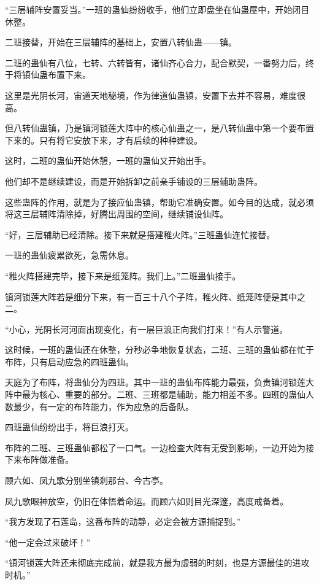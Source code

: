 
\begin{this_body}

“三层辅阵安置妥当。”一班的蛊仙纷纷收手，他们立即盘坐在仙蛊屋中，开始闭目休整。

二班接替，开始在三层辅阵的基础上，安置八转仙蛊——镇。

二班的蛊仙有八位，七转、六转皆有，诸仙齐心合力，配合默契，一番努力后，终于将镇仙蛊布置下来。

这里是光阴长河，宙道天地秘境，作为律道仙蛊镇，安置下去并不容易，难度很高。

但八转仙蛊镇，乃是镇河锁莲大阵中的核心仙蛊之一，是八转仙蛊中第一个要布置下来的。只有将它安放下来，才有后续的种种建设。

这时，二班的蛊仙开始休憩，一班的蛊仙又开始出手。

他们却不是继续建设，而是开始拆卸之前亲手铺设的三层辅助蛊阵。

这些蛊阵的作用，就是为了接应仙蛊镇，帮助它准确安置。如今目的达成，就必须将这三层辅阵清除掉，好腾出周围的空间，继续铺设仙阵。

“好，三层辅助已经清除。接下来就是搭建稚火阵。”三班蛊仙连忙接替。

一班的蛊仙疲累欲死，急需休息。

“稚火阵搭建完毕，接下来是纸笼阵。我们上。”二班蛊仙接手。

镇河锁莲大阵若是细分下来，有一百三十八个子阵，稚火阵、纸笼阵便是其中之二。

“小心，光阴长河河面出现变化，有一层巨浪正向我们打来！”有人示警道。

这时候，一班的蛊仙还在休整，分秒必争地恢复状态，二班、三班的蛊仙都在忙于布阵，只有启动应急的四班蛊仙。

天庭为了布阵，将蛊仙分为四班。其中一班的蛊仙布阵能力最强，负责镇河锁莲大阵中最为核心、重要的部分。二班、三班都是辅助，能力相差不多。四班的蛊仙人数最少，有一定的布阵能力，作为应急的后备队。

四班蛊仙纷纷出手，将巨浪打灭。

布阵的二班、三班蛊仙都松了一口气。一边检查大阵有无受到影响，一边开始为接下来布阵做准备。

顾六如、凤九歌分别坐镇刹那台、今古亭。

凤九歌眼神放空，仍旧在体悟着命运。而顾六如则目光深邃，高度戒备着。

“我方发现了石莲岛，这番布阵的动静，必定会被方源捕捉到。”

“他一定会过来破坏！”

“镇河锁莲大阵还未彻底完成前，就是我方最为虚弱的时刻，也是方源最佳的进攻时机。”


\end{this_body}
